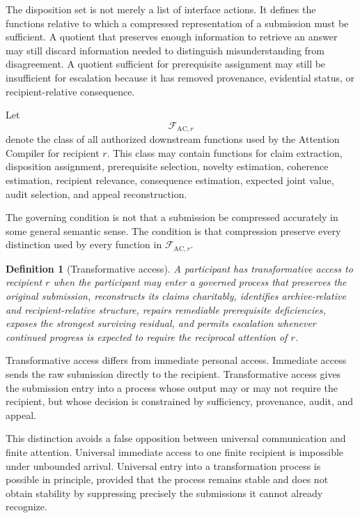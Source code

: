\documentclass[11pt]{article}
\newtheorem{definition}{Definition}[section]
\theoremstyle{definition}
\newcommand{\F}{\mathcal{F}}
\begin{document}
The disposition set is not merely a list of interface actions. It defines the functions relative to which a compressed representation of a submission must be sufficient. A quotient that preserves enough information to retrieve an answer may still discard information needed to distinguish misunderstanding from disagreement. A quotient sufficient for prerequisite assignment may still be insufficient for escalation because it has removed provenance, evidential status, or recipient-relative consequence.

Let
\[
\F_{\mathrm{AC},r}
\]
denote the class of all authorized downstream functions used by the Attention Compiler for recipient \(r\). This class may contain functions for claim extraction, disposition assignment, prerequisite selection, novelty estimation, coherence estimation, recipient relevance, consequence estimation, expected joint value, audit selection, and appeal reconstruction.

The governing condition is not that a submission be compressed accurately in some general semantic sense. The condition is that compression preserve every distinction used by every function in \(\F_{\mathrm{AC},r}\).

\begin{definition}[Transformative access]
A participant has transformative access to recipient \(r\) when the participant may enter a governed process that preserves the original submission, reconstructs its claims charitably, identifies archive-relative and recipient-relative structure, repairs remediable prerequisite deficiencies, exposes the strongest surviving residual, and permits escalation whenever continued progress is expected to require the reciprocal attention of \(r\).
\end{definition}

Transformative access differs from immediate personal access. Immediate access sends the raw submission directly to the recipient. Transformative access gives the submission entry into a process whose output may or may not require the recipient, but whose decision is constrained by sufficiency, provenance, audit, and appeal.

This distinction avoids a false opposition between universal communication and finite attention. Universal immediate access to one finite recipient is impossible under unbounded arrival. Universal entry into a transformation process is possible in principle, provided that the process remains stable and does not obtain stability by suppressing precisely the submissions it cannot already recognize.
\end{document}
